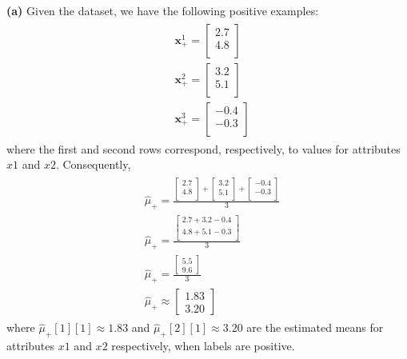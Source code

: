 \documentclass[leqno]{article}
\begin{document}
\noindent \textbf{(a)} Given the dataset, we have the following positive examples:
\begin{gather*}
\begin{split}
&\textbf{x}_+^1 = 
 \begin{bmatrix}
   2.7 \\
   4.8 \\
 \end{bmatrix}\\
&\textbf{x}_+^2 = 
 \begin{bmatrix}
   3.2 \\
   5.1 \\
\end{bmatrix}\\
&\textbf{x}_+^3 = 
 \begin{bmatrix}
   -0.4 \\
   -0.3\\
 \end{bmatrix}
\end{split}
\end{gather*}
where the first and second rows correspond, respectively, to values for attributes $x1$ and $x2$. 
Consequently,  
\begin{gather*}
\begin{split}
&\hat{\mu}_+ = 
 \frac{ \begin{bmatrix}
   2.7 \\
   4.8\\ 
 \end{bmatrix} +  \begin{bmatrix}
   3.2 \\
   5.1\\ 
 \end{bmatrix} +  \begin{bmatrix}
   -0.4 \\
   -0.3 \\
 \end{bmatrix}}{3}\\
&\hat{\mu}_+ = 
 \frac{\begin{bmatrix}
   2.7 + 3.2 - 0.4\\
   4.8 + 5.1 - 0.3\\ 
   \end{bmatrix}}{3}\\
&\hat{\mu}_+ = 
 \frac{\begin{bmatrix}
   5.5\\
   9.6 
   \end{bmatrix}}{3}\\
&\hat{\mu}_+ \approx 
\begin{bmatrix}
   1.83\\
   3.20 
   \end{bmatrix}
\end{split}
\end{gather*}
where $\hat{\mu}_+[1][1] \approx 1.83$ and $\hat{\mu}_+[2][1] \approx 3.20$ are the estimated means for attributes $x1$ and $x2$ respectively, when labels are positive.
\end{document}
